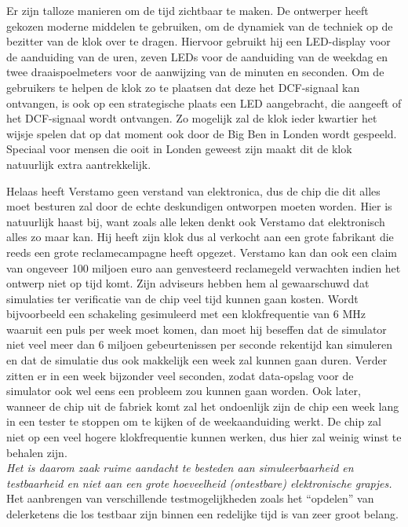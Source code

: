 Er zijn talloze manieren om de tijd zichtbaar te maken. De ontwerper
heeft gekozen moderne middelen  te gebruiken, om de dynamiek van
de techniek op de bezitter van de klok over te dragen. Hiervoor gebruikt hij
een LED-display voor de aanduiding van de uren, zeven LEDs voor de
aanduiding van de weekdag en twee draaispoelmeters voor de aanwijzing
van de minuten en seconden.
Om de gebruikers te helpen de klok zo te plaatsen dat deze het DCF-signaal
kan ontvangen, is ook op een strategische plaats een LED aangebracht,
die aangeeft of het DCF-signaal wordt ontvangen.
Zo mogelijk zal de klok ieder kwartier het wijsje spelen dat op dat moment ook door de Big Ben in Londen wordt gespeeld.
Speciaal voor mensen die ooit in Londen geweest zijn maakt dit de klok natuurlijk extra aantrekkelijk.

Helaas heeft Verstamo geen verstand van elektronica, dus de chip die dit alles moet besturen zal door de echte deskundigen ontworpen moeten worden.
Hier is natuurlijk haast bij, want zoals alle leken denkt ook Verstamo dat elektronisch alles zo maar kan.
Hij heeft zijn klok dus al verkocht aan een grote fabrikant die reeds een grote reclamecampagne heeft opgezet.
Verstamo kan dan ook een claim van ongeveer 100 miljoen euro aan ge{\ii}nvesteerd reclamegeld verwachten indien het ontwerp niet op tijd komt.
Zijn adviseurs hebben hem al gewaarschuwd dat simulaties ter verificatie van de chip veel tijd kunnen gaan kosten.
Wordt bijvoorbeeld een schakeling gesimuleerd met een klokfrequentie van 6 MHz waaruit een puls per week moet komen, dan moet hij beseffen dat de simulator niet veel meer dan 6 miljoen gebeurtenissen per seconde rekentijd kan simuleren en dat de simulatie dus ook makkelijk een week zal kunnen gaan duren.
Verder zitten er in een week bijzonder veel seconden, zodat data-opslag voor de simulator ook wel eens een probleem zou kunnen gaan worden.
Ook later, wanneer de chip uit de fabriek komt zal het ondoenlijk zijn de chip een week lang in een tester te stoppen om te kijken of de weekaanduiding werkt.
De chip zal niet op een veel hogere klokfrequentie kunnen werken, dus hier zal weinig winst te behalen zijn.
\\
{\em Het is daarom zaak ruime aandacht te besteden aan simuleerbaarheid en testbaarheid en niet aan een grote hoeveelheid (ontestbare) elektronische grapjes.}
Het aanbrengen van verschillende testmogelijkheden zoals het ``opdelen'' van delerketens die los testbaar zijn binnen een redelijke tijd is van zeer groot belang.
